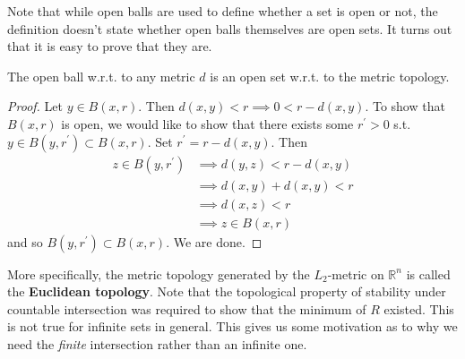     Note that while open balls are used to define whether a set is open or not, the definition doesn't state whether open balls themselves are open sets. It turns out that it is easy to prove that they are. 
    
    \begin{corollary}
      The open ball w.r.t. to any metric $d$ is an open set w.r.t. to the metric topology. 
    \end{corollary}
    \begin{proof}
      Let $y \in B(x, r)$. Then $d(x, y) < r \implies 0 < r - d(x, y)$. To show that $B(x, r)$ is open, we would like to show that there exists some $r^\prime > 0$ s.t. $y \in B(y, r^\prime) \subset B(x, r)$. Set $r^\prime = r - d(x, y)$. Then 
      \begin{align}
        z \in B(y, r^\prime) & \implies d(y, z) < r - d(x, y) \\
                             & \implies d(x, y) + d(x, y) < r \\
                             & \implies d(x, z) < r \\
                             & \implies z \in B(x, r)
      \end{align} 
      and so $B(y, r^\prime) \subset B(x, r)$. We are done. 
    \end{proof}

    More specifically, the metric topology generated by the $L_2$-metric on $\mathbb{R}^n$ is called the \textbf{Euclidean topology}. Note that the topological property of stability under countable intersection was required to show that the minimum of $R$ existed. This is not true for infinite sets in general. This gives us some motivation as to why we need the \textit{finite} intersection rather than an infinite one. 
    
